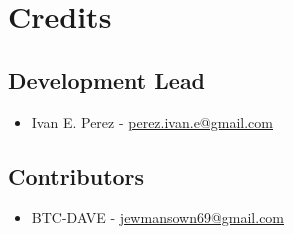 \section{Credits}
\subsection{Development Lead}
\begin{itemize}
	\item Ivan E. Perez -  \href{mailto:perez.ivan.e@gmail.com}{perez.ivan.e@gmail.com}
\end{itemize}
\subsection{Contributors}
\begin{itemize}
	\item BTC-DAVE - \href{mailto:jewmansown69@gmail.com}{jewmansown69@gmail.com}
\end{itemize}
\newpage
